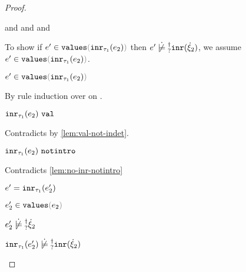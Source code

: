 \begin{proof}
\begin{byCases}
\begin{byCases}
\begin{byCases}
\begin{byCases}
\begin{pfsteps*}
{                and  and  and
                } 
            \end{pfsteps*}
            To show if $\inValues{e'}{\hinr{\tau_1}{e_2}}$ then
            $\cnotsatisfyormay{e'}{\cinr{\hxi_2}}$, we assume
            $\inValues{e'}{\hinr{\tau_1}{e_2}}$.
            \begin{pfsteps*}
            \item $\inValues{e'}{\hinr{\tau_1}{e_2}}$ 
            \end{pfsteps*}
            By rule induction over  on
            .
            \begin{byCases}
            \item[\text{(\ref{rule:IVVal})}]
              \begin{pfsteps*}
              \item $\mathtt{inr}_{\tau_1}({e_2}) ~\mathtt{val}$ 
              \end{pfsteps*}
              Contradicts  by \autoref{lem:val-not-indet}.
            \item[\text{(\ref{rule:IVIndet})}]
              \begin{pfsteps*}
              \item $\mathtt{inr}_{\tau_1}({e_2}) ~\mathtt{notintro}$ 
              \end{pfsteps*}
              Contradicts \autoref{lem:no-inr-notintro} 
            \item[\text{(\ref{rule:IVInr})}]
              \begin{pfsteps*}
              \item $e'=\mathtt{inr}_{\tau_1}({e_2'})$ 
              \item $\inValues{e_2'}{e_2}$ 
              \item $\cnotsatisfyormay{e_2'}{\hxi_2}$  
              \item $\cnotsatisfyormay{\hinr{\tau_1}{e_2'}}{\cinr{\hxi_2}}$
              \end{pfsteps*}
            \end{byCases}

\end{byCases}
\end{byCases}
\end{byCases}
\end{byCases}
\end{proof}
